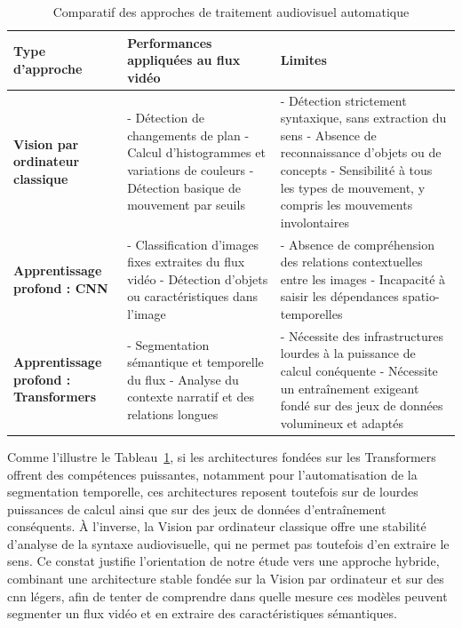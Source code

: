 \begin{table}[H]
	\centering
	\small
	\renewcommand{\arraystretch}{1.3} %
	\begin{tabular}{|p{3.6cm}|p{6.2cm}|p{6.2cm}|} %
		\hline
		\textbf{Type d'approche} & \textbf{Performances appliquées au flux vidéo} & \textbf{Limites} \\
		\hline
		\textbf{Vision par ordinateur classique} 
		& - Détection de changements de plan \newline
		- Calcul d'histogrammes et variations de couleurs \newline
		- Détection basique de mouvement par seuils
		& - Détection strictement syntaxique, sans extraction du sens \newline
		- Absence de reconnaissance d'objets ou de concepts \newline
		- Sensibilité à tous les types de mouvement, y compris les mouvements involontaires \\
		\hline
		\textbf{Apprentissage profond : CNN} 
		& - Classification d'images fixes extraites du flux vidéo \newline
		- Détection d'objets ou caractéristiques dans l'image
		& - Absence de compréhension des relations contextuelles entre les images \newline
		- Incapacité à saisir les dépendances spatio-temporelles \\
		\hline
		\textbf{Apprentissage profond : Transformers} 
		& - Segmentation sémantique et temporelle du flux \newline
		- Analyse du contexte narratif et des relations longues
		& - Nécessite des infrastructures lourdes à la puissance de calcul conéquente \newline
		- Nécessite un entraînement exigeant fondé sur des jeux de données volumineux et adaptés \\
		\hline
	\end{tabular}
	\caption{Comparatif des approches de traitement audiovisuel automatique}
	\label{tab:comparatif_avp}
\end{table}

Comme l'illustre le Tableau~\ref{tab:comparatif_avp}, si les architectures fondées sur les \gls{Transformers} offrent des compétences puissantes, notamment pour l'automatisation de la segmentation temporelle, ces architectures reposent toutefois sur de lourdes puissances de calcul ainsi que sur des jeux de données d'entraînement conséquents. À l'inverse, la \gls{Vision par ordinateur} classique offre une stabilité d'analyse de la syntaxe audiovisuelle, qui ne permet pas toutefois d'en extraire le sens. Ce constat justifie l'orientation de notre étude vers une approche hybride, combinant une architecture stable fondée sur la \gls{Vision par ordinateur} et sur des \gls{cnn} légers, afin de tenter de comprendre dans quelle mesure ces modèles peuvent segmenter un flux vidéo et en extraire des caractéristiques sémantiques.
